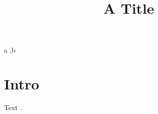 \documentclass{ceurart}
\title{A Title}
\begin{document}
\maketitle
\begin{keywords}
a \sep b
\end{keywords}
\section{Intro}
Text \ceurextra.
\end{document}
